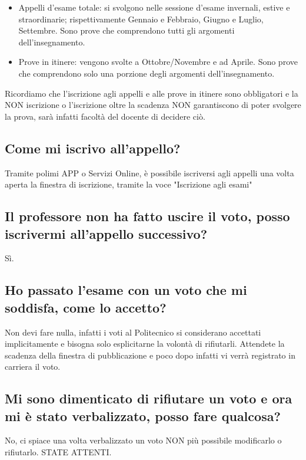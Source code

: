 \documentclass[legal]{polinetwork}
\begin{document}
\begin{itemize}
  \item Appelli d'esame totale: si svolgono nelle sessione d'esame invernali, estive e straordinarie; rispettivamente Gennaio e Febbraio, Giugno e Luglio, Settembre. Sono prove che comprendono tutti gli argomenti dell'insegnamento.
  \item Prove in itinere: vengono svolte a Ottobre/Novembre e ad Aprile. Sono prove che comprendono solo una porzione degli argomenti dell'insegnamento.
\end{itemize}


Ricordiamo che l'iscrizione agli appelli e alle prove in itinere sono obbligatori e la NON iscrizione o l'iscrizione oltre la scadenza NON garantiscono di poter svolgere la prova, sarà infatti facoltà del docente di decidere ciò.

\subsection{Come mi iscrivo all'appello?}


Tramite polimi APP o Servizi Online, è possibile iscriversi agli appelli una volta aperta la finestra di iscrizione, tramite la voce "Iscrizione agli esami"

\subsection{Il professore non ha fatto uscire il voto, posso iscrivermi all'appello successivo?}


Sì.

\subsection{Ho passato l'esame con un voto che mi soddisfa, come lo accetto?}


Non devi fare nulla, infatti i voti al Politecnico si considerano accettati implicitamente e bisogna solo esplicitarne la volontà di rifiutarli. Attendete la scadenza della finestra di pubblicazione e poco dopo infatti vi verrà registrato in carriera il voto.

\subsection{Mi sono dimenticato di rifiutare un voto e ora mi è stato verbalizzato, posso fare qualcosa?}


No, ci spiace una volta verbalizzato un voto NON più possibile modificarlo o rifiutarlo. STATE ATTENTI.
\end{document}
